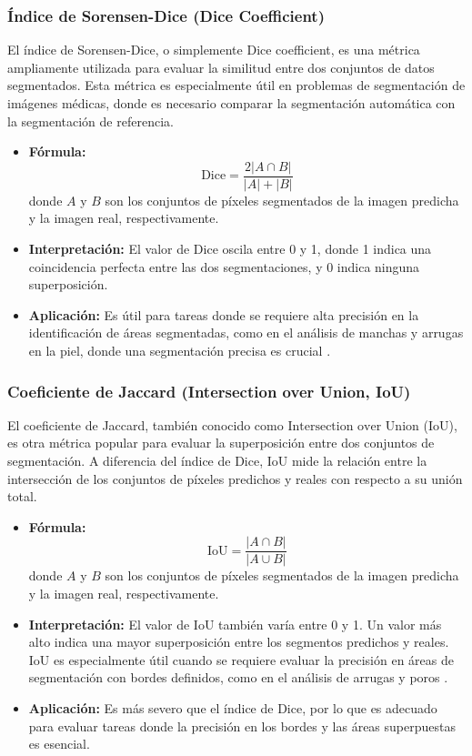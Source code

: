 \subsubsection{Índice de Sorensen-Dice (Dice Coefficient)}  
El índice de Sorensen-Dice, o simplemente Dice coefficient, es una métrica ampliamente utilizada para evaluar la similitud entre dos conjuntos de datos segmentados. Esta métrica es especialmente útil en problemas de segmentación de imágenes médicas, donde es necesario comparar la segmentación automática con la segmentación de referencia.  
\begin{itemize}
    \item \textbf{Fórmula:}  
    \[
    \text{Dice} = \frac{2|A \cap B|}{|A| + |B|}
    \]
    donde \( A \) y \( B \) son los conjuntos de píxeles segmentados de la imagen predicha y la imagen real, respectivamente.
    \item \textbf{Interpretación:} El valor de Dice oscila entre 0 y 1, donde 1 indica una coincidencia perfecta entre las dos segmentaciones, y 0 indica ninguna superposición.
    \item \textbf{Aplicación:} Es útil para tareas donde se requiere alta precisión en la identificación de áreas segmentadas, como en el análisis de manchas y arrugas en la piel, donde una segmentación precisa es crucial \cite{autor2020dice}.
\end{itemize}

\subsubsection{Coeficiente de Jaccard (Intersection over Union, IoU)}  
El coeficiente de Jaccard, también conocido como \( \text{Intersection over Union} \) (IoU), es otra métrica popular para evaluar la superposición entre dos conjuntos de segmentación. A diferencia del índice de Dice, IoU mide la relación entre la intersección de los conjuntos de píxeles predichos y reales con respecto a su unión total.  
\begin{itemize}
    \item \textbf{Fórmula:}  
    \[
    \text{IoU} = \frac{|A \cap B|}{|A \cup B|}
    \]
    donde \( A \) y \( B \) son los conjuntos de píxeles segmentados de la imagen predicha y la imagen real, respectivamente.
    \item \textbf{Interpretación:} El valor de IoU también varía entre 0 y 1. Un valor más alto indica una mayor superposición entre los segmentos predichos y reales. IoU es especialmente útil cuando se requiere evaluar la precisión en áreas de segmentación con bordes definidos, como en el análisis de arrugas y poros \cite{autor2021iou}.
    \item \textbf{Aplicación:} Es más severo que el índice de Dice, por lo que es adecuado para evaluar tareas donde la precisión en los bordes y las áreas superpuestas es esencial.
\end{itemize}

